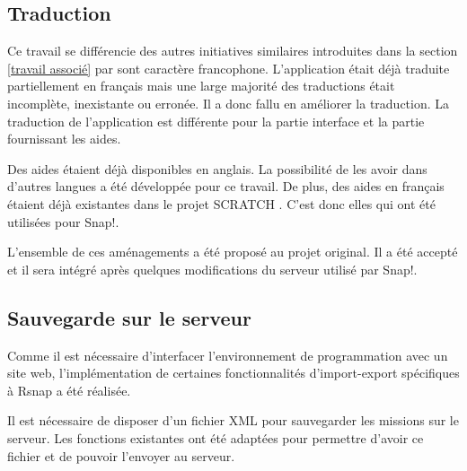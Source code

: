 \subsection{Traduction}
Ce travail se différencie des autres initiatives similaires introduites dans la section \ref{travail associé} par sont caractère francophone. L'application était déjà traduite partiellement en français mais une large majorité des traductions était incomplète, inexistante ou erronée. Il a donc fallu en améliorer la traduction. La traduction de l'application est différente pour la partie interface et la partie fournissant les aides. 

Des aides étaient déjà disponibles en anglais. La possibilité de les avoir dans d'autres langues a été développée pour ce travail. De plus, des aides en français étaient déjà existantes dans le projet SCRATCH \cite{scratch-translation}. C'est donc elles qui ont été utilisées pour Snap!.

L'ensemble de ces aménagements a été proposé au projet original. Il a été accepté et il sera intégré après quelques modifications du serveur utilisé par Snap!.

\subsection{Sauvegarde sur le serveur}
Comme il est nécessaire d'interfacer l'environnement de programmation avec un site web, l'implémentation de certaines fonctionnalités d'import-export spécifiques à Rsnap a été réalisée.

Il est nécessaire de disposer d'un fichier XML pour sauvegarder les missions sur le serveur. Les fonctions existantes ont été adaptées pour permettre d'avoir ce fichier et de pouvoir l'envoyer au serveur.
